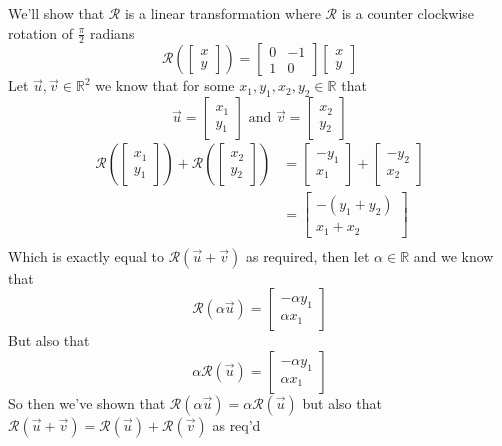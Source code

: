 \documentclass[notoc,notitlepage]{tufte-book}
\newcommand\mat[1]{\begin{bmatrix}#1\end{bmatrix}}
\begin{document}
\begin{eg}
    We'll show that $\mathcal{R}$ is a linear transformation where $\mathcal{R}$
    is a counter clockwise rotation of $\frac{\pi }{2}$ radians
    \begin{equation*}
       \mathcal{R}\left(\mat{ x \\ y }\right) = \mat{ 0 & -1 \\ 1 & 0 } \mat{ x \\ y }
    \end{equation*}
    Let $\vec{u}, \vec{v} \in \mathbb{R}^2$ we know that for some $x_1, y_1,
    x_2, y_2 \in \mathbb{R}$ that
    \begin{equation*}
        \vec{u} = \mat{ x_1 \\ y_1 } \text{ and } \vec{v} = \mat{ x_2 \\ y_2 }
    \end{equation*}
    \begin{align*}
        \mathcal{R}\left(\mat{ x_1 \\ y_1 }\right) + \mathcal{R}\left(\mat{ x_2
        \\ y_2 }\right) &= \mat{ -y_1 \\ x_1 } + \mat{ -y_2 \\ x_2 }\\
                        &= \mat{ - \left( y_1 + y_2 \right) \\ x_1 + x_2 }\\
    \end{align*}
    Which is exactly equal to $\mathcal{R}\left(\vec{u} + \vec{v}\right)$ as
    required, then let $\alpha \in \mathbb{R}$ and we know that
    \begin{equation*}
        \mathcal{R}\left(\alpha \vec{u}\right) = \mat{ -\alpha y_1 \\ \alpha x_1 }
    \end{equation*}
    But also that 
    \begin{equation*}
        \alpha \mathcal{R}\left(\vec{u}\right) = \mat{ -\alpha y_1 \\ \alpha x_1 }
    \end{equation*}
    So then we've shown that $\mathcal{R}\left(\alpha \vec{u}\right) = \alpha
    \mathcal{R }\left(\vec{u}\right)$ but also that $\mathcal{R}\left(\vec{u} + \vec{v}\right) = \mathcal{R}\left(\vec{u}\right) + \mathcal{R}\left(\vec{v}\right)$ as req'd
\end{eg}
\end{document}
